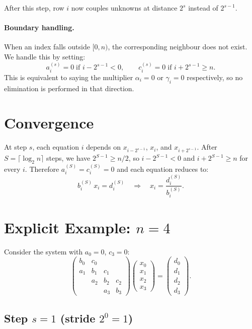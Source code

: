 \documentclass[11pt]{article}
\begin{document}
After this step, row $i$ now couples unknowns at distance $2^s$ instead of $2^{s-1}$.

\paragraph{Boundary handling.}
When an index falls outside $[0, n)$, the corresponding neighbour does not exist.
We handle this by setting:
\[
a_i^{(s)} = 0 \;\text{if } i - 2^{s-1} < 0, \qquad
c_i^{(s)} = 0 \;\text{if } i + 2^{s-1} \geq n.
\]
This is equivalent to saying the multiplier $\alpha_i = 0$ or $\gamma_i = 0$
respectively, so no elimination is performed in that direction.

\section{Convergence}

At step $s$, each equation $i$ depends on $x_{i-2^{s-1}}$, $x_i$, and $x_{i+2^{s-1}}$.
After $S = \lceil \log_2 n \rceil$ steps, we have $2^{S-1} \geq n/2$, so
$i - 2^{S-1} < 0$ and $i + 2^{S-1} \geq n$ for every $i$. Therefore
$a_i^{(S)} = c_i^{(S)} = 0$ and each equation reduces to:
\[
b_i^{(S)} \, x_i = d_i^{(S)} \quad \Longrightarrow \quad x_i = \frac{d_i^{(S)}}{b_i^{(S)}}.
\]

\section{Explicit Example: $n = 4$}

Consider the system with $a_0 = 0$, $c_3 = 0$:
\[
\begin{pmatrix}
b_0 & c_0 &     &     \\
a_1 & b_1 & c_1 &     \\
    & a_2 & b_2 & c_2 \\
    &     & a_3 & b_3
\end{pmatrix}
\begin{pmatrix} x_0 \\ x_1 \\ x_2 \\ x_3 \end{pmatrix}
=
\begin{pmatrix} d_0 \\ d_1 \\ d_2 \\ d_3 \end{pmatrix}.
\]

\subsection{Step $s = 1$ (stride $2^0 = 1$)}
\end{document}
